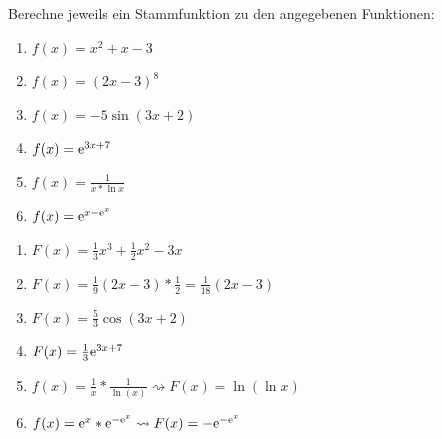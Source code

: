  Berechne jeweils ein Stammfunktion zu den angegebenen Funktionen:
\begin{multicols}{3}
	\begin{enumerate}
		\item $f(x)=x^2+x-3$
		\item $f(x)=(2x-3)^8$
		\item $f(x)=-5\sin(3x+2)$
		\item $f(x)=\mathrm{e}^{3x+7}$
		\item $f(x)=\frac{1}{x*\ln x}$
		\item $f(x)=\mathrm{e}^{x-\mathrm{e}^x}$
	\end{enumerate}
\end{multicols}
\begin{lsg}{}
	\begin{multicols}{2}
		\begin{enumerate}
			\item $F(x)=\frac 1 3x^3+\frac 1 2 x^2-3x$
			\item $F(x)=\frac 1 9 (2x-3)*\frac 1 2=\frac{1}{18}(2x-3)$
			\item $F(x)=\frac 5 3 \cos(3x+2)$
			\item $F(x)=\frac 1 3 \mathrm{e}^{3x+7}$
			\item $f(x)=\frac 1 x*\frac{1}{\ln(x)}\rightsquigarrow F(x)=\ln(\ln x)$
			\item $f(x)=\mathrm{e}^x*\mathrm{e}^{-\mathrm{e}^x}\rightsquigarrow F(x)=-\mathrm{e}^{-\mathrm{e}^x}$
		\end{enumerate}
	\end{multicols}
\end{lsg}





